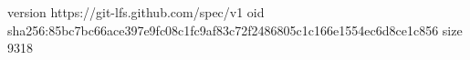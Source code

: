 version https://git-lfs.github.com/spec/v1
oid sha256:85bc7bc66ace397e9fc08c1fc9af83c72f2486805c1c166e1554ec6d8ce1c856
size 9318
